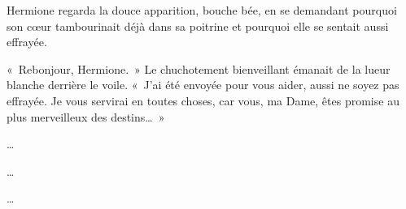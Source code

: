 Hermione regarda la douce apparition, bouche bée, en se demandant pourquoi son cœur tambourinait déjà dans sa poitrine et pourquoi elle se sentait aussi effrayée.

«~Rebonjour, Hermione.~»
Le chuchotement bienveillant émanait de la lueur blanche derrière le voile.
«~J'ai été envoyée pour vous aider, aussi ne soyez pas effrayée.
Je vous servirai en toutes choses, car vous, ma Dame, êtes promise au plus merveilleux des destins…~»

\begin{center}
…

…

…
\end{center}

